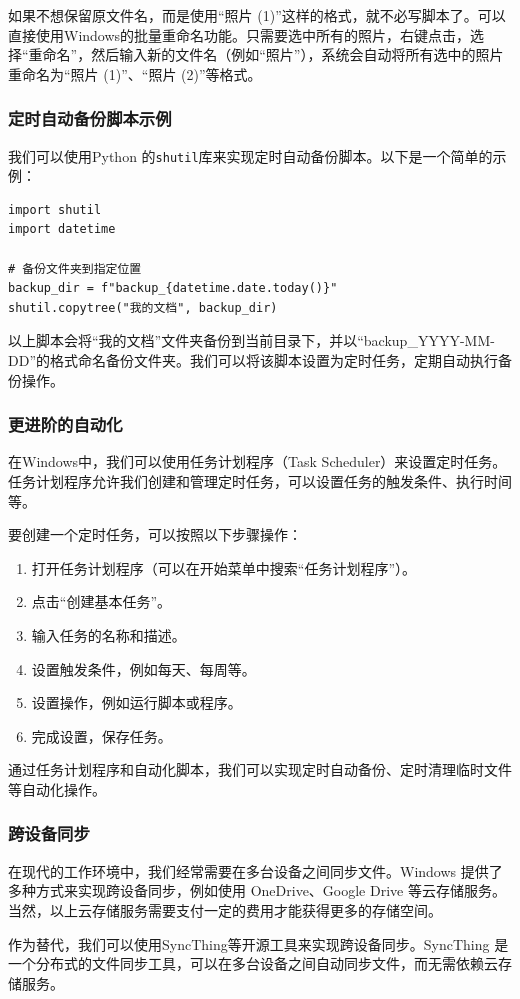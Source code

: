 \documentclass[../main.tex]{subfiles}
\begin{document}
如果不想保留原文件名，而是使用“照片 (1)”这样的格式，就不必写脚本了。可以直接使用Windows的批量重命名功能。只需要选中所有的照片，右键点击，选择“重命名”，然后输入新的文件名（例如“照片”），系统会自动将所有选中的照片重命名为“照片 (1)”、“照片 (2)”等格式。

\subsubsection{定时自动备份脚本示例}

我们可以使用Python 的\texttt{shutil}库来实现定时自动备份脚本。以下是一个简单的示例：
\begin{verbatim}
import shutil  
import datetime  

# 备份文件夹到指定位置  
backup_dir = f"backup_{datetime.date.today()}"  
shutil.copytree("我的文档", backup_dir)  
\end{verbatim}

以上脚本会将“我的文档”文件夹备份到当前目录下，并以“backup\_YYYY-MM-DD”的格式命名备份文件夹。我们可以将该脚本设置为定时任务，定期自动执行备份操作。

\subsubsection{更进阶的自动化}

在Windows中，我们可以使用任务计划程序（Task Scheduler）来设置定时任务。任务计划程序允许我们创建和管理定时任务，可以设置任务的触发条件、执行时间等。

要创建一个定时任务，可以按照以下步骤操作：
\begin{enumerate}
  \item 打开任务计划程序（可以在开始菜单中搜索“任务计划程序”）。
  \item 点击“创建基本任务”。
  \item 输入任务的名称和描述。
  \item 设置触发条件，例如每天、每周等。
  \item 设置操作，例如运行脚本或程序。
  \item 完成设置，保存任务。
\end{enumerate}

通过任务计划程序和自动化脚本，我们可以实现定时自动备份、定时清理临时文件等自动化操作。

\subsubsection{跨设备同步}

在现代的工作环境中，我们经常需要在多台设备之间同步文件。Windows 提供了多种方式来实现跨设备同步，例如使用 OneDrive、Google Drive 等云存储服务。当然，以上云存储服务需要支付一定的费用才能获得更多的存储空间。

作为替代，我们可以使用SyncThing等开源工具来实现跨设备同步。SyncThing 是一个分布式的文件同步工具，可以在多台设备之间自动同步文件，而无需依赖云存储服务。
\end{document}
